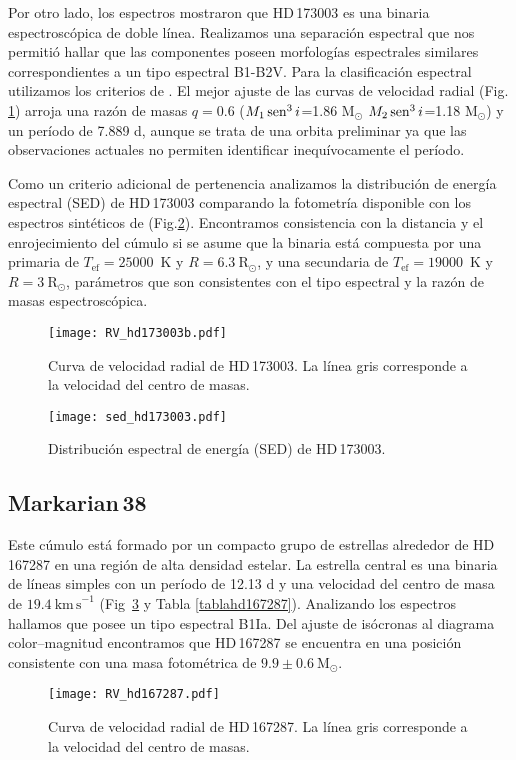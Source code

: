 \documentclass[baaa]{baaa}
\begin{document}
Por otro lado, los espectros mostraron que HD\,173003 es una binaria espectroscópica de doble línea. Realizamos una separación espectral que nos permitió hallar que las componentes poseen morfologías espectrales similares correspondientes a un tipo espectral B1-B2V. Para la clasificación espectral utilizamos los criterios de \citet{2009ssc..book.....G}. El mejor ajuste de las curvas de velocidad radial (Fig. \ref{Fighd173003}) arroja una razón de masas  $q=0.6$ ($M_1\mathop{\rm sen}\nolimits^3 i$=1.86 M$_\odot$ $M_2\mathop{\rm sen}\nolimits^3 i$=1.18 M$_\odot$) y un período de 7.889 d, aunque se trata de una orbita preliminar ya que las observaciones actuales no permiten identificar inequívocamente el período.

Como un criterio adicional de pertenencia analizamos la distribución de energía espectral (SED) de HD\,173003 comparando la fotometría disponible con los espectros sintéticos de \citet{2014MNRAS.440.1027C}  (Fig.\ref{sedhd173003}). Encontramos consistencia con la distancia y el enrojecimiento del cúmulo si se asume que la binaria está compuesta por una primaria de $T_\mathrm{ef}=25000$~K y  $R=6.3~\mathrm{R_\odot}$, y una secundaria de 
$T_\mathrm{ef}=19000$~K y  $R=3~\mathrm{R_\odot}$, parámetros que son consistentes con el tipo espectral y la razón de masas espectroscópica. 
\begin{figure}[!t]
\centering
\texttt{[image: RV\_hd173003b.pdf]}
\caption{Curva de velocidad radial de HD\,173003. La línea gris corresponde a la velocidad del centro de masas.}
\label{Fighd173003}
\end{figure}
\begin{figure}[!t]
\centering
\texttt{[image: sed\_hd173003.pdf]}
\caption{Distribución espectral de energía (SED) de HD\,173003.}
\label{sedhd173003}
\end{figure}

\subsection{Markarian\,38}
Este cúmulo está formado por un compacto grupo de estrellas alrededor de HD\,167287 en una región de alta densidad estelar.
La estrella central es una binaria de líneas simples con un período de 12.13 d y una velocidad del centro de masa de $19.4~\mathrm{km\,s}^{-1}$ (Fig~\ref{Fighd167287} y Tabla \ref{tablahd167287}). Analizando los espectros hallamos que posee un tipo espectral B1Ia. 
Del ajuste de isócronas al diagrama color--magnitud encontramos que HD\,167287 se encuentra en una posición consistente con una masa fotométrica de $9.9\pm0.6~\mathrm{M_\odot}$.
\begin{figure}[!t]
\centering
\texttt{[image: RV\_hd167287.pdf]}
\caption{Curva de velocidad radial de HD\,167287. La línea gris corresponde a la velocidad del centro de masas.}
\label{Fighd167287}
\end{figure}
\end{document}
